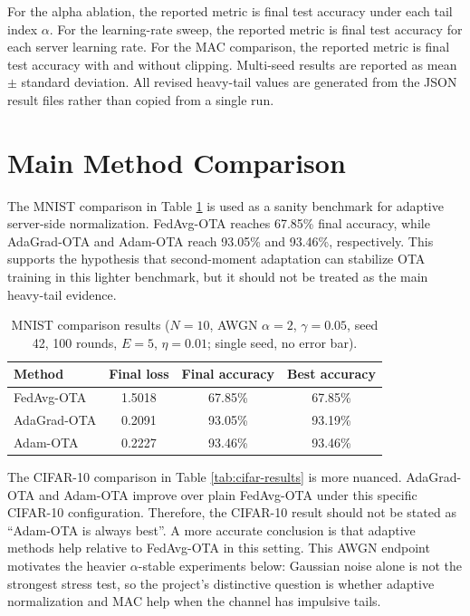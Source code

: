 For the alpha ablation, the reported metric is final test accuracy under each
tail index $\alpha$. For the learning-rate sweep, the reported metric is final
test accuracy for each server learning rate. For the MAC comparison, the
reported metric is final test accuracy with and without clipping. Multi-seed
results are reported as mean $\pm$ standard deviation. All revised heavy-tail
values are generated from the JSON result files rather than copied from a
single run.

\section{Main Method Comparison}
The MNIST comparison in Table \ref{tab:mnist-results} is used as a sanity
benchmark for adaptive server-side normalization. FedAvg-OTA reaches 67.85\%
final accuracy, while AdaGrad-OTA and
Adam-OTA reach 93.05\% and 93.46\%, respectively. This supports the
hypothesis that second-moment adaptation can stabilize OTA training in this
lighter benchmark, but it should not be treated as the main heavy-tail
evidence.

\begin{table}[!htbp]
    \centering
    \caption{MNIST comparison results ($N{=}10$, AWGN $\alpha{=}2$,
    $\gamma{=}0.05$, seed 42, 100 rounds, $E{=}5$,
    $\eta{=}0.01$; single seed, no error bar).}
    \label{tab:mnist-results}
    \begin{tabular}{l|c|c|c}
        \hline
        Method & Final loss & Final accuracy & Best accuracy \\
        \hline
        FedAvg-OTA & 1.5018 & 67.85\% & 67.85\% \\
        AdaGrad-OTA & 0.2091 & 93.05\% & 93.19\% \\
        Adam-OTA & 0.2227 & 93.46\% & 93.46\% \\
        \hline
    \end{tabular}
\end{table}

The CIFAR-10 comparison in Table \ref{tab:cifar-results} is more nuanced.
AdaGrad-OTA and Adam-OTA improve over plain
FedAvg-OTA under this specific
CIFAR-10 configuration. Therefore, the CIFAR-10 result should not be stated as
``Adam-OTA is always best''. A more accurate conclusion is that adaptive
methods help relative to FedAvg-OTA in this setting.
This AWGN endpoint motivates the heavier $\alpha$-stable experiments below:
Gaussian noise alone is not the strongest stress test, so the project's
distinctive question is whether adaptive normalization and MAC help when the
channel has impulsive tails.

